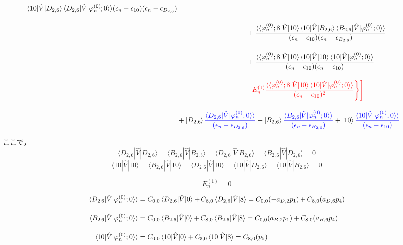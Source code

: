 \begin{align}
{{    \langle{10|\hat{V}|D_{2,6}}\rangle
    \braket{D_{2,6}|\hat{V}|\varphi^{(0)}_n;0}\rangle}
    {(\epsilon_n-\epsilon_{10})(\epsilon_n-\epsilon_{D_{2,6}})}}\nn[10pt]
    &\hspace{100pt}
    +{\frac{\langle\braket{\varphi^{(0)}_{n};8|\hat{V}|10}
    \langle{10|\hat{V}|B_{2,6}}\rangle
    \braket{B_{2,6}|\hat{V}|\varphi^{(0)}_n;0}\rangle}
    {(\epsilon_n-\epsilon_{10})(\epsilon_n-\epsilon_{B_{2,6}})}}\nn[10pt]
    &\hspace{100pt}
    +{\frac{\langle\braket{\varphi^{(0)}_{n};8|\hat{V}|10}
    \langle{10|\hat{V}|10}\rangle
    \braket{10|\hat{V}|\varphi^{(0)}_n;0}\rangle}
    {(\epsilon_n-\epsilon_{10})(\epsilon_n-\epsilon_{10})}}\nn[10pt]
    &\hspace{100pt}
    \textcolor{red}{-E^{(1)}_n
    \frac{\langle\braket{\varphi^{(0)}_{n};8|\hat{V}|10}
    \braket{10|\hat{V}|\varphi^{(0)}_n;0}\rangle}{(\epsilon_n-\epsilon_{10})^2}
    \Biggr\}\Biggr]}
    \nn[10pt]
    &+
    \ket{D_{2,6}}
    \textcolor{blue}{
    \frac{\braket{D_{2,6}|\hat{V}|\varphi^{(0)}_n;0}\rangle}{(\epsilon_n-\epsilon_{D_{2,6}})}}
    +
    \ket{B_{2,6}}
    \textcolor{blue}{
    \frac{\braket{B_{2,6}|\hat{V}|\varphi^{(0)}_n;0}\rangle}{(\epsilon_n-\epsilon_{B_{2,6}})}}
    +
    \ket{10}
    \textcolor{blue}{
    \frac{\braket{10|\hat{V}|\varphi^{(0)}_n;0}\rangle}{(\epsilon_n-\epsilon_{10})}}
\end{align}

ここで，
\begin{equation}
    \langle{D_{2,6}|\hat{V}|D_{2,6}}\rangle
    =\langle{B_{2,6}|\hat{V}|B_{2,6}}\rangle
    =\langle{D_{2,6}|\hat{V}|B_{2,6}}\rangle
    =\langle{B_{2,6}|\hat{V}|D_{2,6}}\rangle=0
\end{equation}
\begin{equation}
    \langle{10|\hat{V}|10}\rangle
    =\langle{B_{2,6}|\hat{V}|10}\rangle
    =\langle{D_{2,6}|\hat{V}|10}\rangle
    =\langle{10|\hat{V}|D_{2,6}}\rangle
     =\langle{10|\hat{V}|B_{2,6}}\rangle=0
\end{equation}

\begin{equation}
    E^{(1)}_n = 0
\end{equation}

\begin{align}
    \braket{D_{2,6}|\hat{V}|\varphi^{(0)}_n;0}\rangle
    &=C_{0,0}\braket{D_{2,6}|\hat{V}|0} + C_{8,0}\braket{D_{2,6}|\hat{V}|8}
    =C_{0,0}(-a_{D,2} p_1) + C_{8,0} (a_{D,6} p_4)\\[10pt]
    \braket{B_{2,6}|\hat{V}|\varphi^{(0)}_n;0}\rangle
    &=C_{0,0}\braket{B_{2,6}|\hat{V}|0} + C_{8,0}\braket{B_{2,6}|\hat{V}|8}
    =C_{0,0}(a_{B,2} p_1) + C_{8,0} (a_{B,6} p_4)\\[10pt]
    \braket{10|\hat{V}|\varphi^{(0)}_n;0}\rangle
    &=C_{0,0}\braket{10|\hat{V}|0} + C_{8,0}\braket{10|\hat{V}|8}
    =C_{8,0} (p_5)
\end{align}

